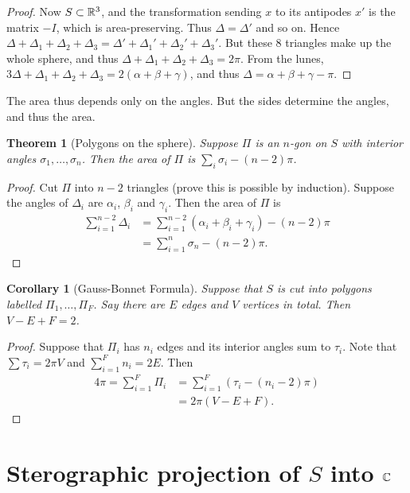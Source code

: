 \documentclass{notes}
\theoremstyle{plain}
\newtheorem{theorem}[proposition]{Theorem}
\newtheorem{corollary}[proposition]{Corollary}
\begin{document}
\begin{proof}
Now $S \subset \mathbb{R}^3$, and the transformation sending $x$ to its antipodes $x'$
is the matrix $-I$, which is area-preserving.  Thus $\Delta = \Delta'$ and so
on.  Hence $\Delta + \Delta_1 + \Delta_2 + \Delta_3 = \Delta' + \Delta_1' +
\Delta_2' + \Delta_3'$.  But these 8 triangles make up the whole sphere, and
thus $\Delta + \Delta_1 + \Delta_2 + \Delta_3 = 2 \pi$.  From the lunes,
$3 \Delta + \Delta_1 + \Delta_2 + \Delta_3 = 2 (\alpha + \beta + \gamma)$, and
thus $\Delta = \alpha + \beta + \gamma - \pi$.
\end{proof}

The area thus depends only on the angles.  But the sides determine the angles,
and thus the area.

\begin{theorem}[Polygons on the sphere]
Suppose $\Pi$ is an $n$-gon on $S$ with interior angles $\sigma_1, \dots,
\sigma_n$.  Then the area of $\Pi$ is $\sum_i \sigma_i - (n-2) \pi$.
\end{theorem}

\begin{proof}
Cut $\Pi$ into $n-2$ triangles (prove this is possible by induction).  Suppose
the angles of $\Delta_i$ are $\alpha_i$, $\beta_i$ and $\gamma_i$.  Then the
area of $\Pi$ is
\begin{align*}
\sum_{i=1}^{n-2} \Delta_i &= \sum_{i=1}^{n-2} (\alpha_i + \beta_i + \gamma_i)
-(n-2) \pi \\
&=\sum_{i=1}^n \sigma_n - (n-2) \pi. 
\end{align*}
\end{proof}

\begin{corollary}[Gauss-Bonnet Formula]
  Suppose that $S$ is cut into polygons labelled $\Pi_1, \dots,
  \Pi_F$.  Say there are $E$ edges and $V$ vertices in total.  Then $V
  - E + F = 2$.
\end{corollary}

\begin{proof}
Suppose that $\Pi_i$ has $n_i$ edges and its interior angles sum to $\tau_i$.
Note that $\sum \tau_i = 2 \pi V$ and $\sum_{i=1}^F n_i = 2 E$.  Then
\begin{align*}
4 \pi = \sum_{i=1}^F \Pi_i &= \sum_{i=1}^F (\tau_i - (n_i - 2) \pi) \\
& = 2 \pi ( V - E + F ).
\end{align*}

\end{proof}

\section{Sterographic projection of $S$ into $\mathbb{C}$}
\end{document}
